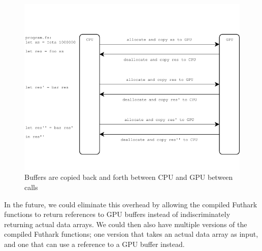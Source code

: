 \begin{figure}[H]
  \centering
  \includegraphics[scale=1.15]{chapters/figs/witharraycopying.pdf}
  \caption{Buffers are copied back and forth between CPU and GPU between calls}
  \label{fig:witharraycopying}
\end{figure}


In the future, we could eliminate this overhead by allowing the compiled Futhark functions
to return references to GPU buffers instead of indiscriminately returning
actual data arrays.
We could then also have multiple versions of the compiled Futhark functions; one
version that takes an actual data array as input, and one that can use a
reference to a GPU buffer instead.

